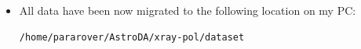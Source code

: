 	\begin{itemize}
		\item All data have been now migrated to the following location on my PC:
		\begin{verbatim}
/home/pararover/AstroDA/xray-pol/dataset
		\end{verbatim}
	\end{itemize}